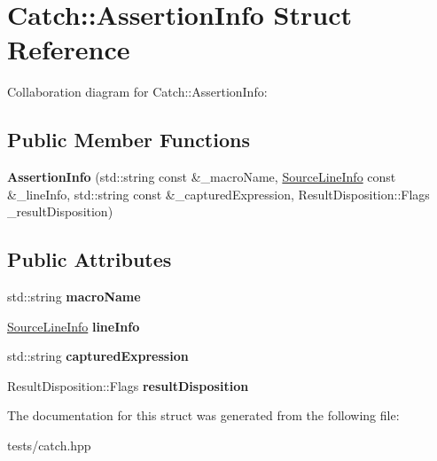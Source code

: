\hypertarget{struct_catch_1_1_assertion_info}{}\section{Catch\+:\+:Assertion\+Info Struct Reference}
\label{struct_catch_1_1_assertion_info}


Collaboration diagram for Catch\+:\+:Assertion\+Info\+:
\subsection*{Public Member Functions}
\begin{DoxyCompactItemize}
\item 
\mbox{\label{struct_catch_1_1_assertion_info_aaf6cc3eebd40391e54d37ed42953c73f}} 
{\bfseries Assertion\+Info} (std\+::string const \&\+\_\+macro\+Name, \hyperlink{struct_catch_1_1_source_line_info}{Source\+Line\+Info} const \&\+\_\+line\+Info, std\+::string const \&\+\_\+captured\+Expression, Result\+Disposition\+::\+Flags \+\_\+result\+Disposition)
\end{DoxyCompactItemize}
\subsection*{Public Attributes}
\begin{DoxyCompactItemize}
\item 
\mbox{\label{struct_catch_1_1_assertion_info_ac2e59e8c89e00eb3390768f50d540b18}} 
std\+::string {\bfseries macro\+Name}
\item 
\mbox{\label{struct_catch_1_1_assertion_info_a17bdbb404ba12658034f833be2f4c3e7}} 
\hyperlink{struct_catch_1_1_source_line_info}{Source\+Line\+Info} {\bfseries line\+Info}
\item 
\mbox{\label{struct_catch_1_1_assertion_info_af7c1d3cbfa346e9a303030fa0ef0cb54}} 
std\+::string {\bfseries captured\+Expression}
\item 
\mbox{\label{struct_catch_1_1_assertion_info_a60353b3632ab2f827162f2b2d6911073}} 
Result\+Disposition\+::\+Flags {\bfseries result\+Disposition}
\end{DoxyCompactItemize}


The documentation for this struct was generated from the following file\+:\begin{DoxyCompactItemize}
\item 
tests/catch.\+hpp\end{DoxyCompactItemize}
